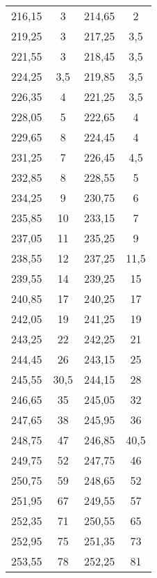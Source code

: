 \begin{longtable}{c c ||c c}
216,15 &        3   &          214,65 &        2   \\
219,25 &        3   &          217,25 &        3,5 \\
221,55 &        3   &          218,45 &        3,5 \\
224,25 &        3,5 &          219,85 &        3,5 \\
226,35 &        4   &          221,25 &        3,5 \\
228,05 &        5   &          222,65 &        4   \\
229,65 &        8   &          224,45 &        4   \\
231,25 &        7   &          226,45 &        4,5 \\
232,85 &        8   &          228,55 &        5   \\
234,25 &        9   &          230,75 &        6   \\
235,85 &       10   &          233,15 &        7   \\
237,05 &       11   &          235,25 &        9   \\
238,55 &       12   &          237,25 &       11,5 \\
239,55 &       14   &          239,25 &       15   \\
240,85 &       17   &          240,25 &       17   \\
242,05 &       19   &          241,25 &       19   \\
243,25 &       22   &          242,25 &       21   \\
244,45 &       26   &          243,15 &       25   \\
245,55 &       30,5 &          244,15 &       28   \\
246,65 &       35   &          245,05 &       32   \\
247,65 &       38   &          245,95 &       36   \\
248,75 &       47   &          246,85 &       40,5 \\
249,75 &       52   &          247,75 &       46   \\
250,75 &       59   &          248,65 &       52   \\
251,95 &       67   &          249,55 &       57   \\
252,35 &       71   &          250,55 &       65   \\
252,95 &       75   &          251,35 &       73   \\
253,55 &       78   &          252,25 &       81   \\

\end{longtable}
